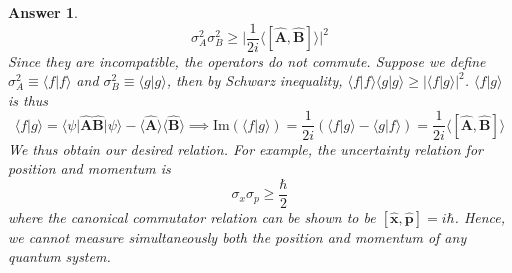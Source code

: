 \documentclass[a4paper]{article}
\newtheorem{ans}{Answer}[subsection]
\theoremstyle{new}
\begin{document}
\begin{ans}
$$\sigma_A^2\sigma_B^2\geq\bigg|\frac{1}{2i}\big\langle[\mathbf{\hat{A}},\mathbf{\hat{B}}]\big\rangle\bigg|^2$$
Since they are incompatible, the operators do not commute. Suppose we define $\sigma_A^2\equiv\big\langle f|f\big\rangle$ and $\sigma_B^2\equiv\big\langle g|g\big\rangle$, then by Schwarz inequality,
$\big\langle f|f\big\rangle\big\langle g|g\big\rangle\geq|\big\langle f|g\big\rangle|^2$. 
$\big\langle f|g\big\rangle$ is thus
$$\big\langle f|g\big\rangle=\big\langle\psi|\mathbf{\hat{A}}\mathbf{\hat{B}}|\psi\big\rangle-\big\langle\mathbf{\hat{A}}\big\rangle\big\langle\mathbf{\hat{B}}\big\rangle\implies\text{Im}(\big\langle f|g\big\rangle)=\frac{1}{2i}(\big\langle f|g\big\rangle-\big\langle g|f\big\rangle)=\frac{1}{2i}\big\langle[\mathbf{\hat{A}},\mathbf{\hat{B}}]\big\rangle$$
We thus obtain our desired relation. For example, the uncertainty relation for position and momentum is 
$$\sigma_x\sigma_p\geq\frac{\hbar}{2}$$
where the canonical commutator relation can be shown to be $[\mathbf{\hat{x}},\mathbf{\hat{p}}]=i\hbar$. Hence, we cannot measure simultaneously both the position and momentum of any quantum system.
\end{ans}
\newpage
\end{document}
